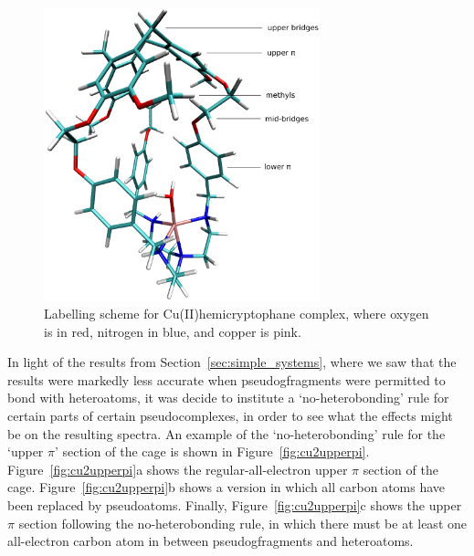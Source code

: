 \documentclass[aip,reprint,nofootinbib]{revtex4-1}
\begin{document}
\begin{figure}
\begin{center}
\includegraphics[width=8cm]{cagecubondslabels}
\caption{Labelling scheme for Cu(II)hemicryptophane complex,  where oxygen is in red, nitrogen in blue, and copper is pink.}\label{fig:cu2labellingscheme}
\end{center}
\end{figure}

In light of the results from Section~\ref{sec:simple_systems}, where we saw that the results were markedly less accurate when pseudogfragments were permitted to bond with heteroatoms, it was decide to institute a `no-heterobonding' rule for certain parts of certain pseudocomplexes, in order to see what the effects might be on the resulting spectra. An example of the `no-heterobonding' rule for the `upper $\pi$' section of the cage is shown in Figure~\ref{fig:cu2upperpi}. Figure~\ref{fig:cu2upperpi}a shows the regular-all-electron upper $\pi$ section of the cage. Figure~\ref{fig:cu2upperpi}b shows a version in which all carbon atoms have been replaced by pseudoatoms. Finally, Figure~\ref{fig:cu2upperpi}c shows the upper $\pi$ section following the no-heterobonding rule, in which there must be at least one all-electron carbon atom in between pseudogfragments and heteroatoms.
\end{document}
